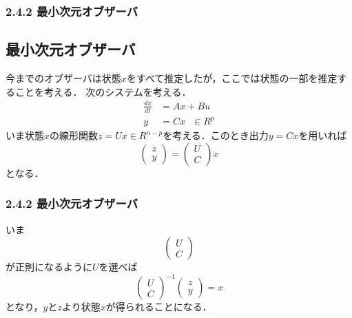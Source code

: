 \begin{frame}[t]
\frametitle{2.4.2 最小次元オブザーバ}
\subsection{最小次元オブザーバ}

今までのオブザーバは状態$x$をすべて推定したが，ここでは状態の一部を推定することを考える．
次のシステムを考える．
\begin{align}
 \frac{dx}{dt} &= A x + B u  \nonumber \\
 y             &= C x \ \ \ \in R^p
\end{align}
いま状態$x$の線形関数$z=Ux \in R^{n-p}$を考える．このとき出力$y= Cx$を用いれば
\begin{equation}
   \left(\begin{array}{c}
	z \\
	y
   \end{array}\right)
   =
   \left(\begin{array}{c}
	U \\
	C
   \end{array}\right)
   x
\end{equation}
となる．
\end{frame}

\begin{frame}[t]
\frametitle{2.4.2 最小次元オブザーバ}
いま
\begin{equation}
   \left(\begin{array}{c}
	U \\
	C
   \end{array}\right)
\end{equation}
が正則になるように$U$を選べば
\begin{equation}
   \left(\begin{array}{c}
	U \\
	C
   \end{array}\right) ^{-1}
   \left(\begin{array}{c}
	z \\
	y
   \end{array}\right)
   =
   x
\end{equation}
となり，$y$と$z$より状態$x$が得られることになる．
\end{frame}

